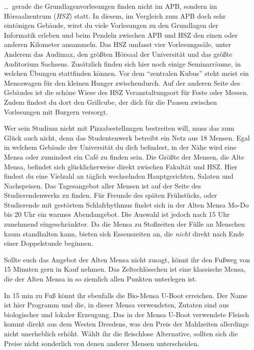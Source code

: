 \dots\ gerade die Grundlagenvorlesungen finden nicht im APB, sondern im Hörsaalzentrum (\emph{HSZ}) statt.
In diesem, im Vergleich zum APB doch sehr eintönigen Gebäude, wirst du viele Vorlesungen zu den Grundlagen der Informatik erleben und beim Pendeln zwischen APB und HSZ den einen oder anderen Kilometer ansammeln.
Das HSZ umfasst vier Vorlesungssäle, unter Anderem das Audimax, den größten Hörsaal der Universität und das größte Auditorium Sachsens.
Zusätzlich finden sich hier noch einige Seminarräume, in welchen Übungen stattfinden können. Vor dem \enquote{zentralen Kubus} steht meist ein Mensawagen für den kleinen Hunger zwischendurch.
Auf der anderen Seite des Gebäudes ist die schöne Wiese des HSZ Veranstaltungsort für Feste oder Messen.
Zudem findest du dort den Grillcube, der dich für die Pausen zwischen Vorlesungen mit Burgern versorgt.

Wer sein Studium nicht mit Pizzabestellungen bestreiten will, muss das zum Glück auch nicht, denn das Studentenwerk betreibt ein Netz aus 18 Mensen.
Egal in welchem Gebäude der Universität du dich befindest, in der Nähe wird eine Mensa oder zumindest ein Café zu finden sein.
Die Größte der Mensen, die Alte Mensa, befindet sich glücklicherweise direkt zwischen Fakultät und HSZ\@.
Hier findest du eine Vielzahl an täglich wechselnden Hauptgerichten, Salaten und Nachspeisen.
Das Tagesangebot aller Mensen ist auf der Seite des Studierendenwerks  zu finden.
Für Freunde des späten Frühstücks, oder Studierende mit gestörtem Schlafrhythmus findet sich in der Alten Mensa Mo-Do bis 20 Uhr ein warmes Abendangebot.
Die Auswahl ist jedoch nach 15 Uhr zunehmend eingeschränkter.
Da die Mensa zu Stoßzeiten der Fülle an Menschen kaum standhalten kann, bieten sich Essenszeiten an, die \emph{nicht} direkt nach Ende einer Doppelstunde beginnen.

Sollte euch das Angebot der Alten Mensa nicht zusagt, könnt ihr den Fußweg von 15 Minuten gern in Kauf nehmen. Das Zeltschlösschen ist eine klassische Mensa, die der Alten Mensa in so ziemlich allen Punkten unterlegen ist.

In 15 min zu Fuß könnt ihr ebenfalls die Bio-Mensa U-Boot erreichen. Der Name ist hier Programm und die, in dieser Mensa verwendeten, Zutaten sind aus biologischer und lokaler Erzeugung.
Das in der Mensa U-Boot verwendete Fleisch kommt direkt aus dem Westen Dresdens, was den Preis der Mahlzeiten allerdings nicht unerheblich erhöht.
Wählt ihr die fleischlose Alternative, sollten sich die Preise nicht sonderlich von denen anderer Mensen unterscheiden.

